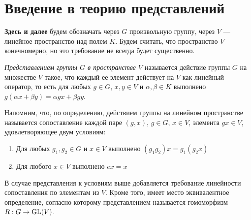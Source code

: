 \section{Введение в теорию представлений}

\textbf{Здесь и далее} будем обозначать через $G$ произвольную группу, через $V$ --- линейное пространство над полем $K$. Будем считать, что пространство $V$ конечномерно, но это требование не всегда будет существенно.

\begin{definition}
	\textit{Представлением группы $G$ в пространстве $V$} называется действие группы $G$ на множестве $V$ такое, что каждый ее элемент действует на $V$ как линейный оператор, то есть для любых $g \in G$,  $x, y \in V$ и $\alpha, \beta \in K$ выполнено $g(\alpha x + \beta y) = \alpha gx + \beta gy$.
\end{definition}

\begin{note}
	Напомним, что, по определению, действием группы на линейном пространстве называется сопоставление каждой паре $(g, x)$, $g \in G$, $x \in V$, элемента $gx \in V$, удовлетворяющее двум условиям:
	\begin{enumerate}
		\item Для любых $g_1, g_2 \in G$ и $x \in V$ выполнено $(g_1g_2)x = g_1(g_2x)$
		\item Для любого $x \in V$ выполнено $ex = x$
	\end{enumerate}
\end{note}

В случае представления к условиям выше добавляется требование линейности сопоставления по элементам из $V$. Кроме того, имеет место эквивалентное определение, согласно которому представлением называется гомоморфизм $R : G \to \operatorname{GL}(V)$.

